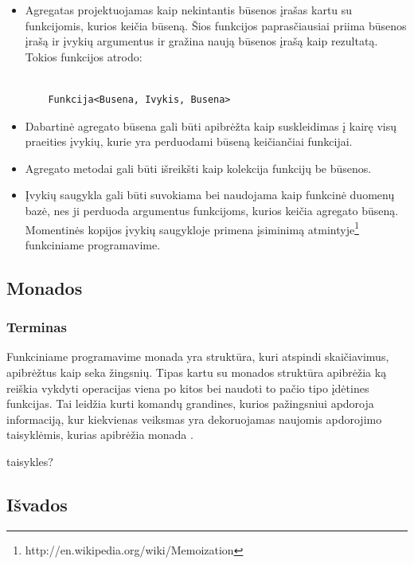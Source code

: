 \begin{itemize}

	\item Agregatas projektuojamas kaip nekintantis būsenos įrašas kartu su funkcijomis, kurios keičia būseną. Šios funkcijos paprasčiausiai priima būsenos įrašą ir įvykių argumentus ir gražina naują būsenos įrašą kaip rezultatą. Tokios funkcijos atrodo:

\begin{lstlisting}

	Funkcija<Busena, Ivykis, Busena>

\end{lstlisting}

	\item Dabartinė agregato būsena gali būti apibrėžta kaip suskleidimas į kairę visų praeities įvykių, kurie yra perduodami būseną keičiančiai funkcijai.

	\item Agregato metodai gali būti išreikšti kaip kolekcija funkcijų be būsenos.

	\item Įvykių saugykla gali būti suvokiama bei naudojama kaip funkcinė duomenų bazė, nes ji perduoda argumentus funkcijoms, kurios keičia agregato būseną. Momentinės kopijos įvykių saugykloje primena įsiminimą atmintyje\footnote{http://en.wikipedia.org/wiki/Memoization} funkciniame programavime.

\end{itemize}

\subsection{Monados}

\subsubsection{Terminas}

Funkciniame programavime monada yra struktūra, kuri atspindi skaičiavimus, apibrėžtus kaip seka žingsnių. Tipas kartu su monados struktūra apibrėžia ką reiškia vykdyti operacijas viena po kitos bei naudoti to pačio tipo įdėtines funkcijas. Tai leidžia kurti komandų grandines, kurios pažingsniui apdoroja informaciją, kur kiekvienas veiksmas yra dekoruojamas naujomis apdorojimo taisyklėmis, kurias apibrėžia monada \cite{OSullivan:2008:RWH:1523280}.

taisykles?

\subsection{Išvados}

